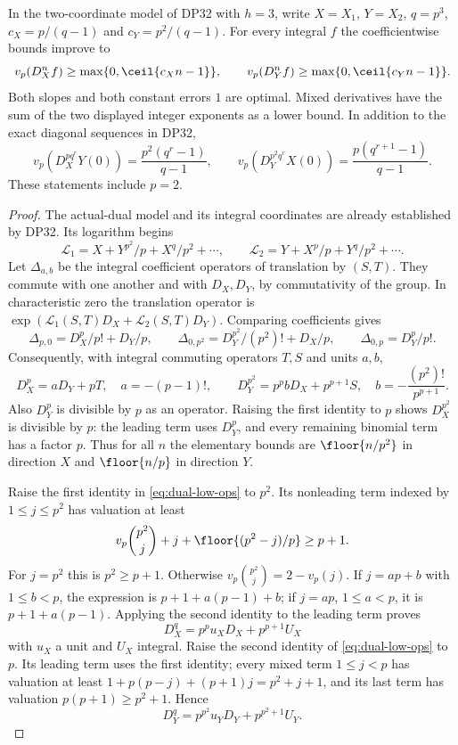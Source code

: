 \begin{theorem}\label{DP33}
In the two-coordinate model of DP32 with $h=3$, write $X=X_1$, $Y=X_2$, $q=p^3$, $c_X=p/(q-1)$ and $c_Y=p^2/(q-1)$. For every integral $f$ the coefficientwise bounds improve to
\[
 v_p(D_X^nf)\ge\max\{0,\ceil{c_Xn-1}\},\qquad
 v_p(D_Y^nf)\ge\max\{0,\ceil{c_Yn-1}\}.
\]
Both slopes and both constant errors $1$ are optimal. Mixed derivatives have the sum of the two displayed integer exponents as a lower bound. In addition to the exact diagonal sequences in DP32,
\[
 v_p(D_X^{pq^r}Y(0))=\frac{p^2(q^r-1)}{q-1},\qquad
 v_p(D_Y^{p^2q^r}X(0))=\frac{p(q^{r+1}-1)}{q-1}.
\]
These statements include $p=2$.
\end{theorem}
\begin{proof}
The actual-dual model and its integral coordinates are already established by DP32. Its logarithm begins
\[
 \mathcal L_1=X+Y^{p^2}/p+X^q/p^2+\cdots,\qquad
 \mathcal L_2=Y+X^p/p+Y^q/p^2+\cdots.
\]
Let $\Delta_{a,b}$ be the integral coefficient operators of translation by $(S,T)$. They commute with one another and with $D_X,D_Y$, by commutativity of the group. In characteristic zero the translation operator is $\exp(\mathcal L_1(S,T)D_X+\mathcal L_2(S,T)D_Y)$. Comparing coefficients gives
\[
 \Delta_{p,0}=D_X^p/p!+D_Y/p,\qquad
 \Delta_{0,p^2}=D_Y^{p^2}/(p^2)!+D_X/p,\qquad
 \Delta_{0,p}=D_Y^p/p!.
\]
Consequently, with integral commuting operators $T,S$ and units $a,b$,
\begin{equation}\label{eq:dual-low-ops}
 D_X^p=aD_Y+pT,\quad a=-(p-1)!,\qquad
 D_Y^{p^2}=p^p bD_X+p^{p+1}S,\quad b=-\frac{(p^2)!}{p^{p+1}}.
\end{equation}
Also $D_Y^p$ is divisible by $p$ as an operator. Raising the first identity to $p$ shows $D_X^{p^2}$ is divisible by $p$: the leading term uses $D_Y^p$, and every remaining binomial term has a factor $p$. Thus for all $n$ the elementary bounds are $\floor{n/p^2}$ in direction $X$ and $\floor{n/p}$ in direction $Y$.

Raise the first identity in \eqref{eq:dual-low-ops} to $p^2$. Its nonleading term indexed by $1\le j\le p^2$ has valuation at least
\[
 v_p\binom{p^2}{j}+j+\floor{(p^2-j)/p}\ge p+1.
\]
For $j=p^2$ this is $p^2\ge p+1$. Otherwise $v_p\binom{p^2}{j}=2-v_p(j)$. If $j=ap+b$ with $1\le b<p$, the expression is $p+1+a(p-1)+b$; if $j=ap$, $1\le a<p$, it is $p+1+a(p-1)$. Applying the second identity to the leading term proves
\[
 D_X^q=p^p u_XD_X+p^{p+1}U_X
\]
with $u_X$ a unit and $U_X$ integral. Raise the second identity of \eqref{eq:dual-low-ops} to $p$. Its leading term uses the first identity; every mixed term $1\le j<p$ has valuation at least $1+p(p-j)+(p+1)j=p^2+j+1$, and its last term has valuation $p(p+1)\ge p^2+1$. Hence
\[
 D_Y^q=p^{p^2}u_YD_Y+p^{p^2+1}U_Y.
\]


\end{proof}

